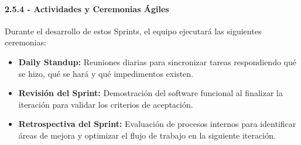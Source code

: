 \paragraph{2.5.4 - Actividades y Ceremonias Ágiles}

Durante el desarrollo de estos Sprints, el equipo ejecutará las siguientes ceremonias:
\begin{itemize}
    \item \textbf{Daily Standup:} Reuniones diarias para sincronizar tareas respondiendo qué se hizo, qué se hará y qué impedimentos existen.  
    \item \textbf{Revisión del Sprint:} Demostración del software funcional al finalizar la iteración para validar los criterios de aceptación.  
    \item \textbf{Retrospectiva del Sprint:} Evaluación de procesos internos para identificar áreas de mejora y optimizar el flujo de trabajo en la siguiente iteración.
\end{itemize}
